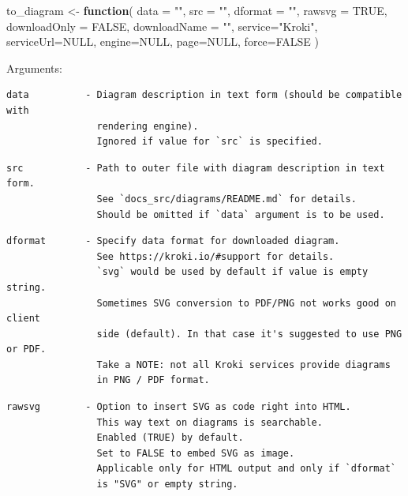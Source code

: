 \documentclass[
  12pt,
  a4paper,
  12pt,
  oneside,
  openany]{book}
\newenvironment{Shaded}{\begin{snugshade}}{\end{snugshade}}
\newcommand{\ControlFlowTok}[1]{\textcolor[rgb]{0.27,0.27,0.27}{\textbf{#1}}}
\newcommand{\DataTypeTok}[1]{\textcolor[rgb]{0.27,0.27,0.27}{#1}}
\newcommand{\NormalTok}[1]{#1}
\newcommand{\OtherTok}[1]{\textcolor[rgb]{0.37,0.37,0.37}{#1}}
\newcommand{\StringTok}[1]{\textcolor[rgb]{0.5,0.5,0.5}{#1}}
\begin{document}
\begin{Shaded}
\begin{Highlighting}[]
\NormalTok{to\_diagram  \textless{}{-}}\StringTok{ }\ControlFlowTok{function}\NormalTok{(}
    \DataTypeTok{data =} \StringTok{""}\NormalTok{, }\DataTypeTok{src =} \StringTok{""}\NormalTok{,}
    \DataTypeTok{dformat =} \StringTok{""}\NormalTok{, }\DataTypeTok{rawsvg =} \OtherTok{TRUE}\NormalTok{,}
    \DataTypeTok{downloadOnly =} \OtherTok{FALSE}\NormalTok{, }\DataTypeTok{downloadName =} \StringTok{""}\NormalTok{,}
    \DataTypeTok{service=}\StringTok{"Kroki"}\NormalTok{, }\DataTypeTok{serviceUrl=}\OtherTok{NULL}\NormalTok{,}
    \DataTypeTok{engine=}\OtherTok{NULL}\NormalTok{,}
    \DataTypeTok{page=}\OtherTok{NULL}\NormalTok{,}
    \DataTypeTok{force=}\OtherTok{FALSE}
\NormalTok{    )}
\end{Highlighting}
\end{Shaded}

Arguments:

\begin{verbatim}
data          - Diagram description in text form (should be compatible with
                rendering engine).
                Ignored if value for `src` is specified.
\end{verbatim}

\begin{verbatim}
src           - Path to outer file with diagram description in text form.
                See `docs_src/diagrams/README.md` for details.
                Should be omitted if `data` argument is to be used.
\end{verbatim}

\begin{verbatim}
dformat       - Specify data format for downloaded diagram.
                See https://kroki.io/#support for details.
                `svg` would be used by default if value is empty string.
                Sometimes SVG conversion to PDF/PNG not works good on client
                side (default). In that case it's suggested to use PNG or PDF.
                Take a NOTE: not all Kroki services provide diagrams
                in PNG / PDF format.
\end{verbatim}

\begin{verbatim}
rawsvg        - Option to insert SVG as code right into HTML.
                This way text on diagrams is searchable.
                Enabled (TRUE) by default.
                Set to FALSE to embed SVG as image.
                Applicable only for HTML output and only if `dformat`
                is "SVG" or empty string.
\end{verbatim}
\end{document}
